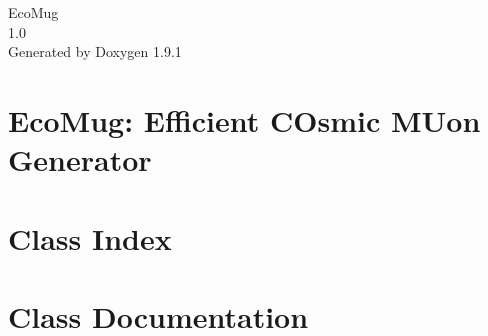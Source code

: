 \let\mypdfximage\pdfximage\def\pdfximage{\immediate\mypdfximage}\documentclass[twoside]{book}
\newcommand{\+}{\discretionary{\mbox{\scriptsize$\hookleftarrow$}}{}{}}
\newcommand{\clearemptydoublepage}{%
  \newpage{\pagestyle{empty}\cleardoublepage}%
}
\begin{document}
\raggedbottom

\hypersetup{pageanchor=false,
             bookmarksnumbered=true,
             pdfencoding=unicode
            }
\begin{titlepage}
\vspace*{7cm}
\begin{center}%
{\Large Eco\+Mug \\[1ex]\large 1.\+0 }\\
\vspace*{1cm}
{\large Generated by Doxygen 1.9.1}\\
\end{center}
\end{titlepage}
\clearemptydoublepage
{}
\tableofcontents
\clearemptydoublepage
{}
\hypersetup{pageanchor=true}

\chapter{Eco\+Mug\+: Efficient COsmic MUon Generator}
\label{md__r_e_a_d_m_e}

\chapter{Class Index}

\chapter{Class Documentation}



\backmatter
\newpage
{}
\clearemptydoublepage
{}
\printindex
\end{document}
